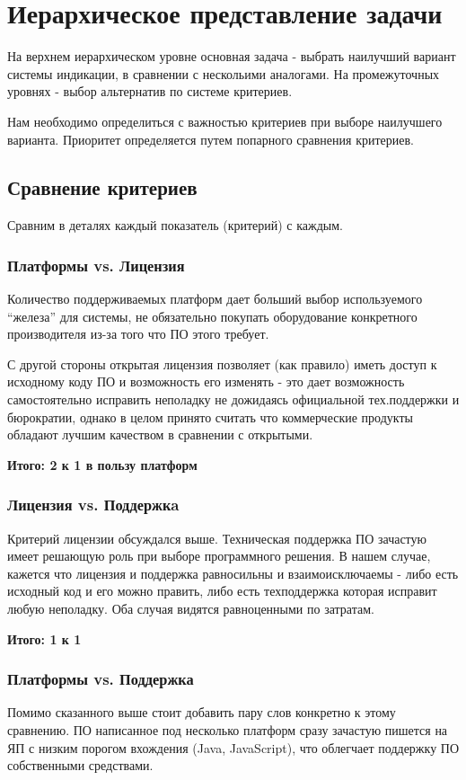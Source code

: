 \documentclass[a4paper,12pt]{report} %
\begin{document}
\section{Иерархическое представление задачи}
На верхнем иерархическом уровне основная задача - выбрать наилучший вариант
системы индикации, в сравнении с нескольими аналогами. На промежуточных уровнях
- выбор альтернатив по системе критериев.

Нам необходимо определиться с важностью критериев при выборе наилучшего
варианта. Приоритет определяется путем попарного сравнения критериев.
\subsection{Сравнение критериев}
Сравним в деталях каждый показатель (критерий) с каждым.
\subsubsection{Платформы vs. Лицензия}
Количество поддерживаемых платформ дает больший выбор используемого ``железа''
для системы, не обязательно покупать оборудование конкретного производителя
из-за того что ПО этого требует.

С другой стороны открытая лицензия позволяет (как правило) иметь доступ к
исходному коду ПО и возможность его изменять - это дает возможность
самостоятельно исправить неполадку не дожидаясь официальной тех.поддержки и
бюрократии, однако в целом принято считать что коммерческие продукты обладают
лучшим качеством в сравнении с открытыми.

\bfseries{Итого:} 2 к 1 в пользу платформ
\subsubsection{Лицензия vs. Поддержкa}
Критерий лицензии обсуждался выше. Техническая поддержка ПО зачастую имеет
решающую роль при выборе программного решения. В нашем случае, кажется что
лицензия и поддержка равносильны и взаимоисключаемы - либо есть исходный код и
его можно править, либо есть техподдержка которая исправит любую неполадку. Оба
случая видятся равноценными по затратам.

\bfseries{Итого:} 1 к 1
\subsubsection{Платформы vs. Поддержка}
Помимо сказанного выше стоит добавить пару слов конкретно к этому сравнению. ПО
написанное под несколько платформ сразу зачастую пишется на ЯП с низким порогом
вхождения (Java, JavaScript), что облегчает поддержку ПО собственными
средствами.
\end{document}
